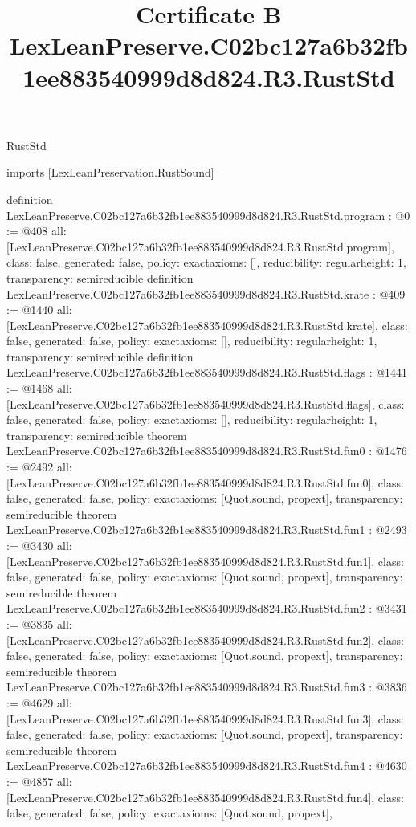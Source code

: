\begin{lexlean}{RustStd}
\title{Certificate B LexLeanPreserve.C02bc127a6b32fb1ee883540999d8d824.R3.RustStd}
\begin{coremodule}
imports [LexLeanPreservation.RustSound]

definition LexLeanPreserve.C02bc127a6b32fb1ee883540999d8d824.R3.RustStd.program : @0 := @408 {
  all: [LexLeanPreserve.C02bc127a6b32fb1ee883540999d8d824.R3.RustStd.program],
  class: false,
  generated: false,
  policy: exact{axioms: []},
  reducibility: regular{height: 1},
  transparency: semireducible
}
definition LexLeanPreserve.C02bc127a6b32fb1ee883540999d8d824.R3.RustStd.krate : @409 := @1440 {
  all: [LexLeanPreserve.C02bc127a6b32fb1ee883540999d8d824.R3.RustStd.krate],
  class: false,
  generated: false,
  policy: exact{axioms: []},
  reducibility: regular{height: 1},
  transparency: semireducible
}
definition LexLeanPreserve.C02bc127a6b32fb1ee883540999d8d824.R3.RustStd.flags : @1441 := @1468 {
  all: [LexLeanPreserve.C02bc127a6b32fb1ee883540999d8d824.R3.RustStd.flags],
  class: false,
  generated: false,
  policy: exact{axioms: []},
  reducibility: regular{height: 1},
  transparency: semireducible
}
theorem LexLeanPreserve.C02bc127a6b32fb1ee883540999d8d824.R3.RustStd.fun0 : @1476 := @2492 {
  all: [LexLeanPreserve.C02bc127a6b32fb1ee883540999d8d824.R3.RustStd.fun0],
  class: false,
  generated: false,
  policy: exact{axioms: [Quot.sound, propext]},
  transparency: semireducible
}
theorem LexLeanPreserve.C02bc127a6b32fb1ee883540999d8d824.R3.RustStd.fun1 : @2493 := @3430 {
  all: [LexLeanPreserve.C02bc127a6b32fb1ee883540999d8d824.R3.RustStd.fun1],
  class: false,
  generated: false,
  policy: exact{axioms: [Quot.sound, propext]},
  transparency: semireducible
}
theorem LexLeanPreserve.C02bc127a6b32fb1ee883540999d8d824.R3.RustStd.fun2 : @3431 := @3835 {
  all: [LexLeanPreserve.C02bc127a6b32fb1ee883540999d8d824.R3.RustStd.fun2],
  class: false,
  generated: false,
  policy: exact{axioms: [Quot.sound, propext]},
  transparency: semireducible
}
theorem LexLeanPreserve.C02bc127a6b32fb1ee883540999d8d824.R3.RustStd.fun3 : @3836 := @4629 {
  all: [LexLeanPreserve.C02bc127a6b32fb1ee883540999d8d824.R3.RustStd.fun3],
  class: false,
  generated: false,
  policy: exact{axioms: [Quot.sound, propext]},
  transparency: semireducible
}
theorem LexLeanPreserve.C02bc127a6b32fb1ee883540999d8d824.R3.RustStd.fun4 : @4630 := @4857 {
  all: [LexLeanPreserve.C02bc127a6b32fb1ee883540999d8d824.R3.RustStd.fun4],
  class: false,
  generated: false,
  policy: exact{axioms: [Quot.sound, propext]},
}
\end{coremodule}
\end{lexlean}
